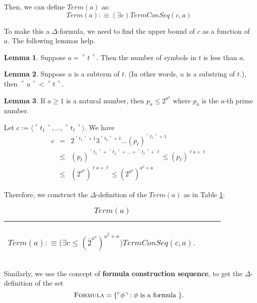 \documentclass[11pt,letterpaper]{book}
\theoremstyle{definition}
\newtheorem{lemma}{Lemma}[section]
\begin{document}
Then, we can define $Term(a)$ as:
$$ Term(a) : \equiv (\exists c) TermConSeq(c, a) $$

To make this a $\Delta$-formula, we need to find the upper bound of $c$ as a function of $a$. The following lemmas help.

\begin{lemma}
Suppose $a = \ulcorner t \urcorner$. Then the number of symbols in $t$ is less than $a$.
\end{lemma}

\begin{lemma}
Suppose $u$ is a subterm of $t$. (In other words, $u$ is a substring of $t$.), then $\ulcorner u \urcorner < \ulcorner t \urcorner$.
\end{lemma}

\begin{lemma}
If $a \geq 1$ is a natural number, then $p_a \leq 2^{a^a}$ where $p_a$ is the $a$-th prime number.
\end{lemma}

Let $c:= \langle \ulcorner t_1 \urcorner, \ldots, \ulcorner t_{\ell} \urcorner \rangle$. We have
\begin{eqnarray*}
c &=& 2^{\ulcorner t_1 \urcorner + 1} 3^{\ulcorner t_2 \urcorner + 1} \ldots (p_{\ell})^{\ulcorner t_{\ell} \urcorner + 1} \\
 &\leq & (p_{\ell})^{\ulcorner t_1 \urcorner + \ulcorner t_2 \urcorner+ \ldots + \ulcorner t_{\ell} \urcorner + \ell } \leq (p_{\ell})^{ \ell a + \ell } \\
 & \leq & (2^{a^a})^{ \ell a + \ell }  \leq (2^{a^a})^{ a^2 + a }  
\end{eqnarray*}

Therefore, we construct the $\Delta$-definition of the $Term(a)$ as in Table \ref{box:term}:


\begin{table}[h]
\caption{$Term(a)$}
\label{box:term}
\begin{tabular}{|p{0.9\linewidth}|}
\hline
\rule{0pt}{3ex}
\begin{center}
$Term(a) : \equiv \big(\exists c \leq (\overline{2}^{a^a})^{ a^{\overline{2}} + a }  \big) TermConSeq(c, a). $
\end{center}\\
\hline
\end{tabular}
\end{table}

Similarly, we use the concept of \textbf{formula construction sequence}, to get the $\Delta$-definition of the set
$$\text{\textsc{Formula}} = \{ \ulcorner \phi \urcorner : \phi \text{ is a formula } \}. $$
\end{document}
